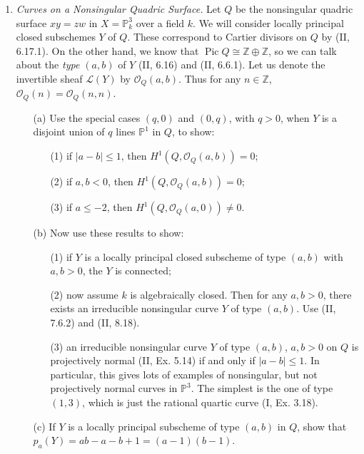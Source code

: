 \documentclass{article}
\newcommand{\fO}{\mathscr{O}}
\newcommand{\fL}{\mathscr{L}}
\newcommand{\PP}{\mathbb{P}}
\newcommand{\Z}{\mathbb{Z}}
\DeclareMathOperator{\pic}{Pic}
\begin{document}
\begin{enumerate} [label=\textbf{\arabic*.}, leftmargin=0em]
\item \textit{Curves on a Nonsingular Quadric Surface.} Let $Q$ be the nonsingular quadric surface $xy = zw$ in $X = \PP_k^3$ over a field $k$. We will consider locally principal closed subschemes $Y$ of $Q$. These correspond to Cartier divisors on $Q$ by (II, 6.17.1). On the other hand, we know that $\pic{Q} \cong \Z \oplus \Z$, so we can talk about the \textit{type $(a, b)$} of $Y$ (II, 6.16) and (II, 6.6.1). Let us denote the invertible sheaf $\fL(Y)$ by $\fO_Q(a, b)$. Thus for any $n \in \Z$, $\fO_Q(n) = \fO_Q(n, n)$.
\begin{itemize}
  \item[(a)] Use the special cases $(q, 0)$ and $(0, q)$, with $q > 0$, when $Y$ is a disjoint union of $q$ lines $\PP^1$ in $Q$, to show:
  \begin{itemize}
    \item[(1)] if $|a - b| \leq 1$, then $H^1(Q, \fO_Q(a, b)) = 0$;
    \item[(2)] if $a, b < 0$, then $H^1(Q, \fO_Q(a, b)) = 0$;
    \item[(3)] if $a \leq -2$, then $H^1(Q, \fO_Q(a, 0)) \neq 0$.
  \end{itemize}
  \item[(b)] Now use these results to show:
  \begin{itemize}
    \item[(1)] if $Y$ is a locally principal closed subscheme of type $(a, b)$ with $a, b > 0$, the $Y$ is connected;
    \item[(2)] now assume $k$ is algebraically closed. Then for any $a, b > 0$, there exists an irreducible nonsingular curve $Y$ of type $(a, b)$. Use (II, 7.6.2) and (II, 8.18).
    \item[(3)] an irreducible nonsingular curve $Y$ of type $(a, b)$, $a, b > 0$ on $Q$ is projectively normal (II, Ex. 5.14) if and only if $|a - b| \leq 1$. In particular, this gives lots of examples of nonsingular, but not projectively normal curves in $\PP^3$. The simplest is the one of type $(1, 3)$, which is just the rational quartic curve (I, Ex. 3.18).
  \end{itemize}
  \item[(c)] If $Y$ is a locally principal subscheme of type $(a, b)$ in $Q$, show that $p_a(Y) = ab - a - b + 1 = (a - 1)(b - 1)$.
\end{itemize}


\end{enumerate}
\end{document}
